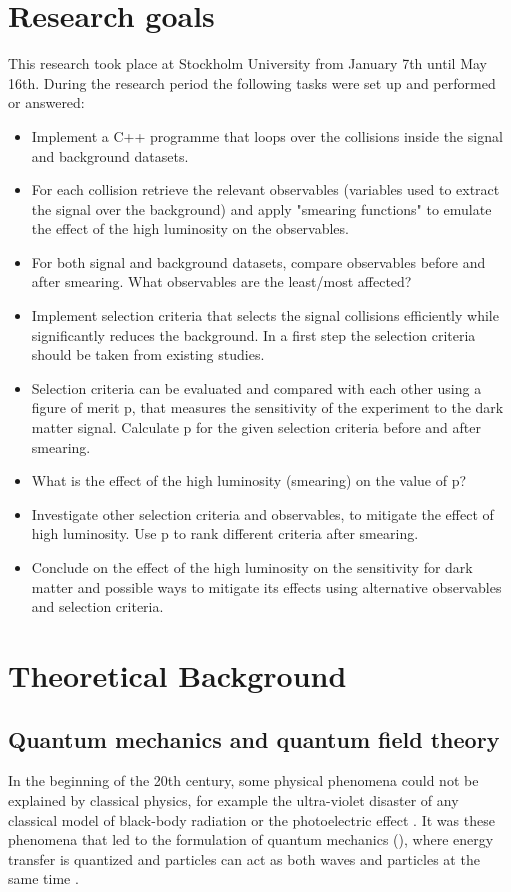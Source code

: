 \section{Research goals}\label{sec:goals}
This research took place at Stockholm University from January 7th until May 16th.
During the research period the following tasks were set up and performed or answered:
\begin{itemize}
\item Implement a C++ programme that loops over the collisions inside the signal and background datasets.	
\item For each collision retrieve the relevant observables (variables used to	 extract the signal over the background) and apply "smearing functions" to emulate the effect of the high luminosity on the observables. 	
\item For both signal and background datasets, compare observables before and after smearing. What observables are the least/most affected?	
\item Implement selection criteria that selects the signal collisions efficiently while significantly reduces the background. In a first step the selection criteria should be taken from existing studies.
\item Selection criteria can be evaluated and compared with each other using a figure of merit p, that measures the sensitivity of the experiment to the	 dark matter signal. Calculate p for the given selection criteria before and after smearing.
\item What is the effect of the high luminosity (smearing) on the value of p?
\item Investigate other selection criteria and observables, to mitigate the effect of high luminosity. Use p to rank different criteria after smearing.
\item Conclude on the effect of the high luminosity on the sensitivity for dark matter and possible ways to mitigate its effects using alternative observables and selection criteria. 
\end{itemize}
\newpage
\section{Theoretical Background}\label{sec:tb}
\subsection{Quantum mechanics and quantum field theory}\label{sec:tb:subsec:qm}
In the beginning of the 20th century, some physical phenomena could not be explained by classical physics, for example the ultra-violet disaster of any classical model of black-body radiation or the photoelectric effect \citep{Bransden:2000}.
It was these phenomena that led to the formulation of quantum mechanics (\abbrQM), where energy transfer is quantized and particles can act as both waves and particles at the same time \citep{Bransden:2000, Hallsjo:2013}.

